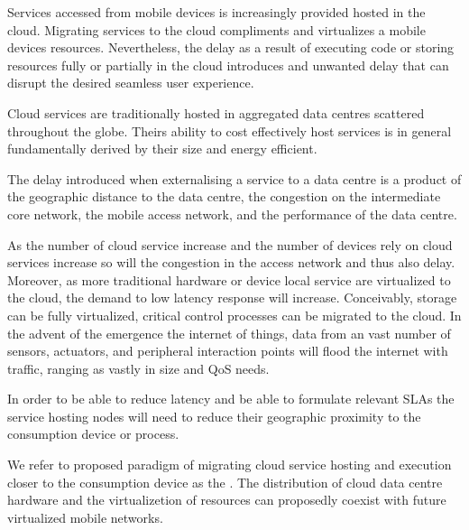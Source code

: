 Services accessed from mobile devices is increasingly provided hosted in the cloud. Migrating services to the cloud compliments and virtualizes a mobile devices resources. Nevertheless, the delay as a result of executing code or storing resources fully or partially in the cloud introduces and unwanted delay that can disrupt the desired seamless user experience.

Cloud services are traditionally hosted in aggregated data centres scattered throughout the globe. Theirs ability to cost effectively host services is in general fundamentally derived by their size and energy efficient. 

The delay introduced when externalising a service to a data centre is a product of the geographic distance to the data centre, the congestion on the intermediate core network, the mobile access network, and the performance of the data centre.

As the number of cloud service increase and the number of devices rely on cloud services increase 
so will the congestion in the access network and thus also delay. Moreover, as more traditional hardware or device local service are virtualized to the cloud, the demand to low latency response will increase. Conceivably, storage can be fully virtualized, critical control processes can be migrated to the cloud. In the advent of the emergence the internet of things, data from an vast number of sensors, actuators, and peripheral interaction points will flood the internet with traffic, ranging as vastly in size and QoS needs.

In order to be able to reduce latency and be able to formulate relevant SLAs the service hosting nodes will need to reduce their geographic proximity to the consumption device or process.

We refer to proposed paradigm of migrating cloud service hosting and execution closer to the consumption device as the \xcloud. The distribution of cloud data centre hardware and the virtualizetion of resources can proposedly coexist with future virtualized mobile networks.